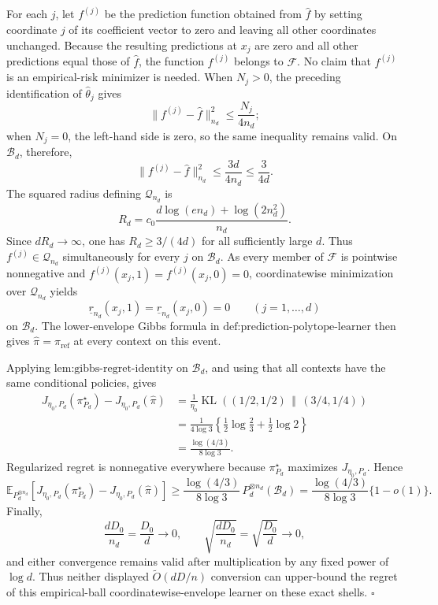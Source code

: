 For each \(j\), let \(f^{(j)}\) be the prediction function obtained from \(\widehat f\) by setting coordinate \(j\) of its coefficient vector to zero and leaving all other coordinates unchanged.  Because the resulting predictions at \(x_j\) are zero and all other predictions equal those of \(\widehat f\), the function \(f^{(j)}\) belongs to \(\mathcal F\).  No claim that \(f^{(j)}\) is an empirical-risk minimizer is needed.  When \(N_j>0\), the preceding identification of \(\widehat\theta_j\) gives
\[
\|f^{(j)}-\widehat f\|_{n_d}^2
\le \frac{N_j}{4n_d};
\]
when \(N_j=0\), the left-hand side is zero, so the same inequality remains valid.  On \(\mathcal B_d\), therefore,
\[
\|f^{(j)}-\widehat f\|_{n_d}^2
\le \frac{3d}{4n_d}
\le \frac{3}{4d}.
\]
The squared radius defining \(\mathcal Q_{n_d}\) is
\[
R_d=c_0\frac{d\log(en_d)+\log(2n_d^2)}{n_d}.
\]
Since \(dR_d\to\infty\), one has \(R_d\ge3/(4d)\) for all sufficiently large \(d\).  Thus \(f^{(j)}\in\mathcal Q_{n_d}\) simultaneously for every \(j\) on \(\mathcal B_d\).  As every member of \(\mathcal F\) is pointwise nonnegative and \(f^{(j)}(x_j,1)=f^{(j)}(x_j,0)=0\), coordinatewise minimization over \(\mathcal Q_{n_d}\) yields
\[
\underline r_{n_d}(x_j,1)=\underline r_{n_d}(x_j,0)=0
\qquad (j=1,\ldots,d)
\]
on \(\mathcal B_d\).  The lower-envelope Gibbs formula in \(\text{def:prediction-polytope-learner}\) then gives \(\widehat\pi=\pi_{\mathrm{ref}}\) at every context on this event.

Applying \(\text{lem:gibbs-regret-identity}\) on \(\mathcal B_d\), and using that all contexts have the same conditional policies, gives
\[
\begin{aligned}
J_{\eta_0,P_d}(\pi_{P_d}^\star)-J_{\eta_0,P_d}(\widehat\pi)
&=\frac1{\eta_0}\operatorname{KL}\left((1/2,1/2)\,\middle\Vert\,(3/4,1/4)\right)\\
&=\frac1{4\log3}\left\{\frac12\log\frac23+\frac12\log2\right\}\\
&=\frac{\log(4/3)}{8\log3}.
\end{aligned}
\]
Regularized regret is nonnegative everywhere because \(\pi_{P_d}^\star\) maximizes \(J_{\eta_0,P_d}\).  Hence
\[
\mathbb E_{P_d^{\otimes n_d}}\!\left[J_{\eta_0,P_d}(\pi_{P_d}^\star)-J_{\eta_0,P_d}(\widehat\pi)\right]
\ge \frac{\log(4/3)}{8\log3}\,P_d^{\otimes n_d}(\mathcal B_d)
=\frac{\log(4/3)}{8\log3}\{1-o(1)\}.
\]
Finally,
\[
\frac{dD_0}{n_d}=\frac{D_0}{d}\longrightarrow0,
\qquad
\sqrt{\frac{dD_0}{n_d}}=\sqrt{\frac{D_0}{d}}\longrightarrow0,
\]
and either convergence remains valid after multiplication by any fixed power of \(\log d\).  Thus neither displayed \(\widetilde O(dD/n)\) conversion can upper-bound the regret of this empirical-ball coordinatewise-envelope learner on these exact shells. \(\square\)